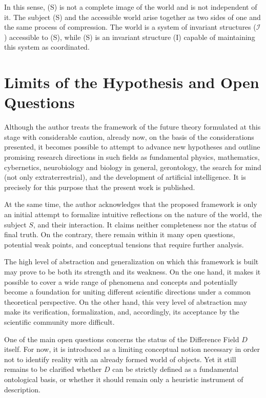 \documentclass[aps,prd,onecolumn,nofootinbib,superscriptaddress]{revtex4-2}
\begin{document}
In this sense, (S) is not a complete image of the world and is not independent of it. The subject (S) and the accessible world arise together as two sides of one and the same process of compression. The world is a system of invariant structures ($\mathcal{I}$) accessible to (S), while (S) is an invariant structure (I) capable of maintaining this system as coordinated.

\section{Limits of the Hypothesis and Open Questions}

Although the author treats the framework of the future theory formulated at this stage with considerable caution, already now, on the basis of the considerations presented, it becomes possible to attempt to advance new hypotheses and outline promising research directions in such fields as fundamental physics, mathematics, cybernetics, neurobiology and biology in general, gerontology, the search for mind (not only extraterrestrial), and the development of artificial intelligence. It is precisely for this purpose that the present work is published.

At the same time, the author acknowledges that the proposed framework is only an initial attempt to formalize intuitive reflections on the nature of the world, the subject \(S\), and their interaction. It claims neither completeness nor the status of final truth. On the contrary, there remain within it many open questions, potential weak points, and conceptual tensions that require further analysis.

The high level of abstraction and generalization on which this framework is built may prove to be both its strength and its weakness. On the one hand, it makes it possible to cover a wide range of phenomena and concepts and potentially become a foundation for uniting different scientific directions under a common theoretical perspective. On the other hand, this very level of abstraction may make its verification, formalization, and, accordingly, its acceptance by the scientific community more difficult.

One of the main open questions concerns the status of the Difference Field \(D\) itself. For now, it is introduced as a limiting conceptual notion necessary in order not to identify reality with an already formed world of objects. Yet it still remains to be clarified whether \(D\) can be strictly defined as a fundamental ontological basis, or whether it should remain only a heuristic instrument of description.
\end{document}
